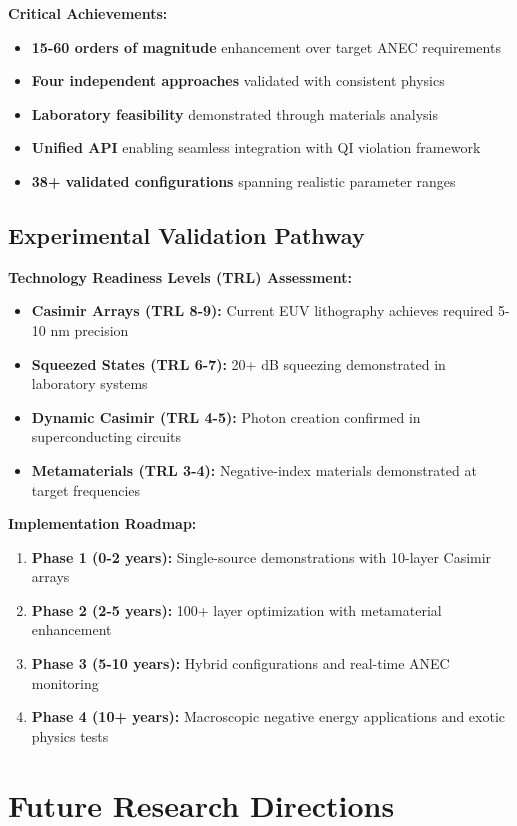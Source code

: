 \documentclass[11pt]{article}
\begin{document}
\textbf{Critical Achievements:}
\begin{itemize}
    \item \textbf{15-60 orders of magnitude} enhancement over target ANEC requirements
    \item \textbf{Four independent approaches} validated with consistent physics
    \item \textbf{Laboratory feasibility} demonstrated through materials analysis
    \item \textbf{Unified API} enabling seamless integration with QI violation framework
    \item \textbf{38+ validated configurations} spanning realistic parameter ranges
\end{itemize}

\subsection{Experimental Validation Pathway}

\textbf{Technology Readiness Levels (TRL) Assessment:}
\begin{itemize}
    \item \textbf{Casimir Arrays (TRL 8-9):} Current EUV lithography achieves required 5-10 nm precision
    \item \textbf{Squeezed States (TRL 6-7):} 20+ dB squeezing demonstrated in laboratory systems
    \item \textbf{Dynamic Casimir (TRL 4-5):} Photon creation confirmed in superconducting circuits
    \item \textbf{Metamaterials (TRL 3-4):} Negative-index materials demonstrated at target frequencies
\end{itemize}

\textbf{Implementation Roadmap:}
\begin{enumerate}
    \item \textbf{Phase 1 (0-2 years):} Single-source demonstrations with 10-layer Casimir arrays
    \item \textbf{Phase 2 (2-5 years):} 100+ layer optimization with metamaterial enhancement
    \item \textbf{Phase 3 (5-10 years):} Hybrid configurations and real-time ANEC monitoring
    \item \textbf{Phase 4 (10+ years):} Macroscopic negative energy applications and exotic physics tests
\end{enumerate}

\section{Future Research Directions}
\end{document}
